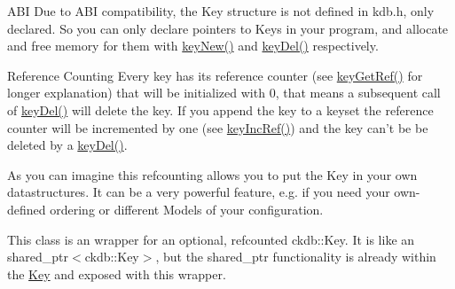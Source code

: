 \begin{DoxyParagraph}{A\-B\-I}
Due to A\-B\-I compatibility, the {\ttfamily Key} structure is not defined in kdb.\-h, only declared. So you can only declare {\ttfamily pointers} to {\ttfamily Keys} in your program, and allocate and free memory for them with \hyperlink{group__key_gad23c65b44bf48d773759e1f9a4d43b89}{key\-New()} and \hyperlink{group__key_ga3df95bbc2494e3e6703ece5639be5bb1}{key\-Del()} respectively.
\end{DoxyParagraph}
\begin{DoxyParagraph}{Reference Counting}
Every key has its reference counter (see \hyperlink{group__key_ga4aabc4272506dd63161db2bbb42de8ae}{key\-Get\-Ref()} for longer explanation) that will be initialized with 0, that means a subsequent call of \hyperlink{group__key_ga3df95bbc2494e3e6703ece5639be5bb1}{key\-Del()} will delete the key. If you append the key to a keyset the reference counter will be incremented by one (see \hyperlink{group__key_ga6970a6f254d67af7e39f8e469bb162f1}{key\-Inc\-Ref()}) and the key can't be be deleted by a \hyperlink{group__key_ga3df95bbc2494e3e6703ece5639be5bb1}{key\-Del()}.
\end{DoxyParagraph}
\begin{DoxyParagraph}{}
As you can imagine this refcounting allows you to put the Key in your own datastructures. It can be a very powerful feature, e.\-g. if you need your own-\/defined ordering or different Models of your configuration. 
\end{DoxyParagraph}


This class is an wrapper for an optional, refcounted ckdb\-::\-Key. It is like an shared\-\_\-ptr$<$ckdb\-::\-Key$>$, but the shared\-\_\-ptr functionality is already within the \hyperlink{classkdb_1_1Key}{Key} and exposed with this wrapper.

